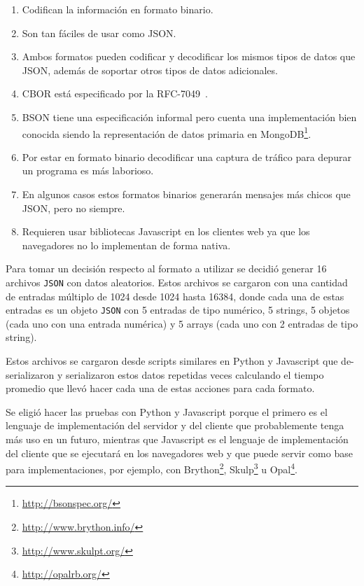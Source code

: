\begin{enumerate}
    \item Codifican la información en formato binario.
    \item Son tan fáciles de usar como JSON.
    \item Ambos formatos pueden codificar y decodificar los mismos tipos de datos
        que JSON, además de soportar otros tipos de datos adicionales.
    \item CBOR está especificado por la RFC-7049~\citep{rfc-7049}.
    \item BSON tiene una especificación informal pero cuenta una
        implementación bien conocida siendo la representación de datos primaria en
        MongoDB\footnote{\url{http://bsonspec.org/}}.
    \item Por estar en formato binario decodificar una captura de tráfico
        para depurar un programa es más laborioso.
    \item En algunos casos estos formatos binarios generarán mensajes más
        chicos que JSON, pero no siempre.
    \item Requieren usar bibliotecas Javascript en los clientes web ya que los
        navegadores no lo implementan de forma nativa.
\end{enumerate}

Para tomar un decisión respecto al formato a utilizar se decidió generar
16 archivos \texttt{JSON} con datos aleatorios. Estos archivos se cargaron
con una cantidad de entradas múltiplo de 1024 desde 1024 hasta 16384, donde
cada una de estas entradas es un objeto \texttt{JSON} con 5 entradas de tipo
numérico, 5 strings, 5 objetos (cada uno con una entrada numérica) y 5
arrays (cada uno con 2 entradas de tipo string).

Estos archivos se cargaron desde scripts similares en Python y Javascript que
de-serializaron y serializaron estos datos repetidas veces calculando el tiempo
promedio que llevó hacer cada una de estas acciones para cada formato.

Se eligió hacer las pruebas con Python y Javascript porque el primero es el
lenguaje de implementación del servidor y del cliente que probablemente tenga
más uso en un futuro, mientras que Javascript es el lenguaje de implementación
del cliente que se ejecutará en los navegadores web y que puede servir como
base para implementaciones, por ejemplo, con
Brython\footnote{\url{http://www.brython.info/}},
Skulp\footnote{\url{http://www.skulpt.org/}} u
Opal\footnote{\url{http://opalrb.org/}}.

